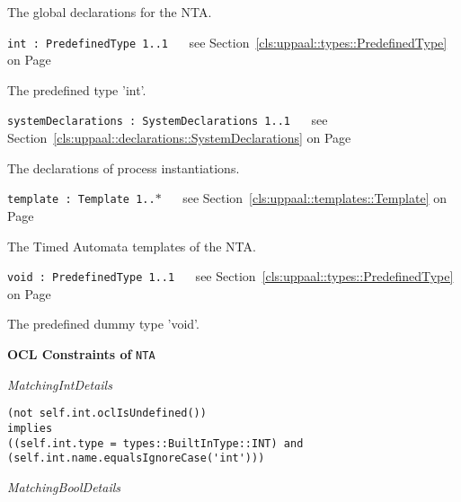\begin{longdescription}
\begin{longdescription}
	\nopagebreak
		
				

	

		The global declarations for the NTA.		
	\item[\texttt{int : PredefinedType 	\symbol{"5B}1..1\symbol{"5D}
}] ~
	see Section~\ref{cls:uppaal::types::PredefinedType} on Page~\pageref{cls:uppaal::types::PredefinedType}
	
	\nopagebreak
		
				

	

		The predefined type 'int'.		
	\item[\texttt{systemDeclarations : SystemDeclarations 	\symbol{"5B}1..1\symbol{"5D}
}] ~
	see Section~\ref{cls:uppaal::declarations::SystemDeclarations} on Page~\pageref{cls:uppaal::declarations::SystemDeclarations}
	
	\nopagebreak
		
				

	

		The declarations of process instantiations.		
	\item[\texttt{template : Template 	\symbol{"5B}1..$*$\symbol{"5D}
}] ~
	see Section~\ref{cls:uppaal::templates::Template} on Page~\pageref{cls:uppaal::templates::Template}
	
	\nopagebreak
		
				

	

		The Timed Automata templates of the NTA.		
	\item[\texttt{void : PredefinedType 	\symbol{"5B}1..1\symbol{"5D}
}] ~
	see Section~\ref{cls:uppaal::types::PredefinedType} on Page~\pageref{cls:uppaal::types::PredefinedType}
	
	\nopagebreak
		
				

	

		The predefined dummy type 'void'.		
			\end{longdescription}
			\item[\textbf{OCL Constraints of} \texttt{NTA}] ~
			\begin{longdescription}
	\item[\small\textit{MatchingIntDetails}] ~ 
	\nopagebreak
	
		\begin{lstlisting}[breaklines=true]
(not self.int.oclIsUndefined())
implies
((self.int.type = types::BuiltInType::INT) and (self.int.name.equalsIgnoreCase('int')))		\end{lstlisting}
	\item[\small\textit{MatchingBoolDetails}] ~ 
	\nopagebreak
	

\end{longdescription}
\end{longdescription}
